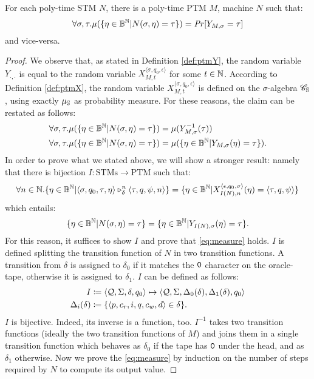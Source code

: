 \begin{prop}
\label{prop:ptm=sfp}
For each poly-time STM $N$, there is a poly-time PTM $M$, machine $N$ such that:
$$
\forall \sigma, \tau.\mu(\{\eta \in \mathbb{B}^{\mathbb{N}}| N(\sigma, \eta)= \tau\})=\mathit{Pr}[{Y_{M,\sigma}}=\tau]
$$
and vice-versa.
\end{prop}


\begin{proof}
We observe that, as stated in Definition \ref{def:ptmY}, the random variable
$Y_{\cdot, \cdot}$ is equal to the random variable
$X_{M, t}^{\langle \sigma, q_0, \epsilon\rangle}$ for some $t \in \mathbb{N}$.
According to Definition \ref{def:ptmX}, the random variable
$X_{M, t}^{\langle \sigma, q_0, \epsilon\rangle}$ is defined on the $\sigma$-algebra
$\mathscr C_{\mathbb{S}}$, using exactly $\mu_{\mathbb{S}}$ as probability measure.
%
For these reasons, the claim can be restated as follows:
%
\begin{align*}
\forall \sigma, \tau.\mu(\{\eta \in \mathbb{B}^{\mathbb{N}}| N(\sigma, \eta)= \tau\})&=\mu(Y_{M, \sigma}^{-1}(\tau))\\
\forall \sigma, \tau.\mu(\{\eta \in \mathbb{B}^{\mathbb{N}}| N(\sigma, \eta)= \tau\})&=\mu(\{\eta \in \mathbb{B}^{\mathbb{N}}| Y_{M,\sigma} (\eta) = \tau\}).
\end{align*}
\noindent
In order to prove what we stated above,
we will show a stronger result: namely that there is bijection $I: \text{STMs} \longrightarrow \text{PTM}$ such that:
%
\begin{equation}
\label{eq:measure}
\forall n \in \mathbb{N}.\{\eta \in \mathbb{B}^{\mathbb{N}}| \langle \sigma, q_0, \tau, \eta\rangle  \triangleright^{n}_{\delta} \langle \tau, q, \psi, n\rangle \} = \{\eta \in \mathbb{B}^{\mathbb{N}}| X_{I(N), n}^{\langle \epsilon, q_0, \sigma\rangle} (\eta)= {\langle \tau, q, \psi\rangle}\}
\end{equation}
\noindent
which entails:
%
\begin{equation}
\label{eq:measurecons}
\{\eta \in \mathbb{B}^{\mathbb{N}}| N(\sigma, \eta)= \tau\} = \{\eta \in \mathbb{B}^{\mathbb{N}}| Y_{I(N),\sigma} (\eta) = \tau\}.
\end{equation}
\noindent
For this reason, it suffices to show $I$ and prove that \ref{eq:measure} holds.
$I$ is defined splitting the transition function of $N$ in two
transition functions. A transition from $\delta$ is assigned to $\delta_0$
if it matches the $\mathtt{0}$ character on the oracle-tape, otherwise it
is assigned to $\delta_1$.
%
$I$ can be defined as follows:
%
\begin{align*}
I &\coloneqq \langle \mathcal{Q}, \Sigma, \delta, q_0 \rangle \mapsto \langle \mathcal{Q}, \Sigma, \Delta_0(\delta),\Delta_1(\delta), q_0 \rangle\\
\Delta_i(\delta) &\coloneqq \{\langle p, c_r, i, q, c_w, d \rangle \in \delta \}.
\end{align*}
\noindent
$I$ is bijective. Indeed, its inverse is a function, too.
$I^{-1}$ takes two transition functions  (ideally the two transition functions of $M$)
and joins them in a single transition function which behaves as $\delta_0$ if the tape has $\mathtt{0}$
under the head, and as $\delta_1$ otherwise.
%
Now we prove the \ref{eq:measure} by induction on the number of steps required by $N$ to compute its output value.


\end{proof}
